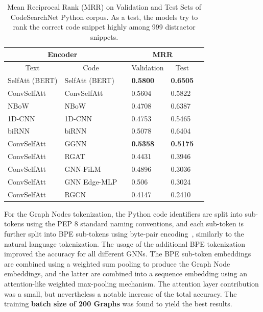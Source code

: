 \documentclass{article}
\begin{document}
\begin{table}[t]
  \begin{tabular}{@{}llllll@{}} \toprule
  \multicolumn{2}{c}{Encoder}&&\multicolumn{2}{c}{MRR}&\\\midrule
  
  \multicolumn{1}{c}{Text} & \multicolumn{1}{c}{Code} && \multicolumn{1}{c}{Validation} & \multicolumn{1}{c}{Test} &  \\ \midrule
  
  SelfAtt (BERT) & SelfAtt (BERT) && \textbf{0.5800} & \textbf{0.6505} \\
  ConvSelfAtt & ConvSelfAtt && 0.5604 & 0.5822 \\ 
  NBoW & NBoW && 0.4708 & 0.6387 \\
  1D-CNN & 1D-CNN && 0.4753 & 0.5465 \\
  biRNN & biRNN && 0.5078 & 0.6404\\\midrule
  ConvSelfAtt & GGNN && \textbf{0.5358} & \textbf{0.5175} \\
  ConvSelfAtt & RGAT && 0.4431 & 0.3946 \\
  ConvSelfAtt & GNN-FiLM && 0.4896 & 0.3036 \\
  ConvSelfAtt & GNN Edge-MLP && 0.506 & 0.3024 \\
  ConvSelfAtt & RGCN && 0.4147 & 0.2410 \\

  \bottomrule
  \end{tabular}
  \caption{Mean Reciprocal Rank (MRR) on Validation and Test Sets of CodeSearchNet Python corpus. As a test, the models try to rank the correct code snippet highly among 999 distractor snippets.} \label{tbl:mrr eval}
\end{table}

For the Graph Nodes tokenization, the Python code identifiers are split into sub-tokens using the PEP 8 standard naming conventions,  and each sub-token is further split into BPE sub-tokens using byte-pair encoding~\cite{gage1994new,sennrich2016neural}, similarly to the natural language tokenization. The usage of the additional BPE tokenization improved the accuracy for all different GNNs. The BPE sub-token embeddings are combined using a weighted sum pooling to produce the Graph Node embeddings, and the latter are combined into a sequence embedding using an attention-like weighted max-pooling mechanism. The attention layer contribution was a small, but nevertheless a notable increase of the total accuracy.
The training \textbf{batch size of 200 Graphs} was found to yield the best results.
\end{document}
